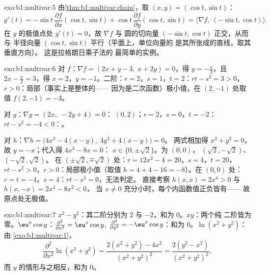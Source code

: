 \begin{solution}{exo:b1:multivar:5}
由\cref{thm:b1:multivar:chain}，取 $(x, y) = (\cos t, \sin t)$：
\[
g'(t) = -\sin t\,\frac{\partial f}{\partial x}(\cos t, \sin t)
+ \cos t\,\frac{\partial f}{\partial y}(\cos t, \sin t)
= \bigl\langle \nabla f,\ (-\sin t, \cos t)\bigr\rangle .
\]
在 $g$ 的极值点处 $g'(t) = 0$，故 $\nabla f$ 与
圆的切向量 $(-\sin t, \cos t)$ 正交，从而与
半径向量 $(\cos t, \sin t)$ 平行（平面上，单位向量的
是其所张成的直线，取其垂直方向）。
这是拉格朗日乘子法的
最简单的实例。
\end{solution}

\begin{solution}{exo:b1:multivar:6}
对 $f$：$\nabla f = (2x + y - 3,\; x + 2y) = 0$，得 $y = -\frac x2$，且
$2x - \frac x2 = 3$，得 $x = 2$，$y = -1$。二阶：$r = 2$，$s =
1$，$t = 2$：$rt - s^2 = 3 > 0$，$r > 0$：局部（事实上是整体的——
因为是二次函数）极小值，在 $(2, -1)$ 处取值 $f(2,-1) = -3$。

对 $g$：$\nabla g = (2x,\; -2y + 4) = 0$： $(0, 2)$；$r = 2$，$s
= 0$，$t = -2$：$rt - s^2 = -4 < 0$：。

对 $h$：$\nabla h = \bigl(4x^3 - 4(x - y),\; 4y^3 + 4(x-y)\bigr) = 0$。
两式相加得 $x^3 + y^3 = 0$，故 $y = -x$；代入得 $4x^3 - 8x = 0$：
$x \in \{0, \pm\sqrt2\}$。为 $(0,0)$，
$(\sqrt2, -\sqrt2)$、$(-\sqrt2, \sqrt2)$。
在 $(\pm\sqrt2, \mp\sqrt2)$ 处：$r = 12x^2 - 4 = 20$，$s = 4$，$t =
20$，$rt - s^2 > 0$，$r > 0$：局部极小值（取值 $h = 4 + 4 - 16 =
-8$）。在 $(0,0)$ 处：$r = t = -4$，$s = 4$：$rt - s^2 = 0$，无法判定。
直接考察 $h(x, x) = 2x^4 > 0$ 与 $h(x, -x) = 2x^4 - 8x^2 < 0$，
当 $x \neq 0$ 充分小时，每个内函数值正负皆有——
故原点处无极值。
\end{solution}

\begin{solution}{exo:b1:multivar:7}
$x^2 - y^2$：其二阶分别为 $2$ 与 $-2$，和为 $0$。$xy$：两个纯
二阶皆为零。$\eu^x\cos y$：$\frac{\partial^2}{\partial
x^2} = \eu^x\cos y$, $\frac{\partial^2}{\partial y^2} =
-\eu^x\cos y$：和为 $0$。$\ln(x^2+y^2)$：由
\cref{exo:b1:multivar:1}，
\[
\frac{\partial^2}{\partial x^2}\ln(x^2+y^2)
= \frac{2(x^2+y^2) - 4x^2}{(x^2+y^2)^2}
= \frac{2(y^2 - x^2)}{(x^2+y^2)^2},
\]
而 $y$ 的情形与之相反，和为 $0$。
\end{solution}

